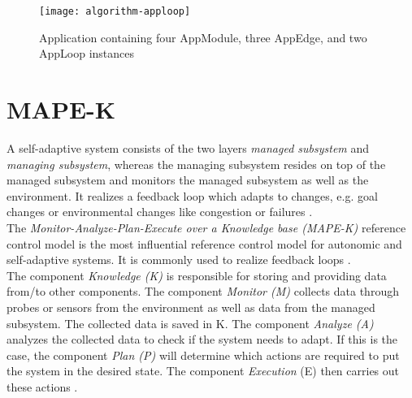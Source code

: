\begin{figure}[htb]
    \centering
    \texttt{[image: algorithm-apploop]}
    \caption{Application containing four AppModule, three AppEdge, and two \mbox{AppLoop} instances}
    \label{fig:apploop}
\end{figure}

\section{MAPE-K}
A self-adaptive system consists of the two layers \textit{managed subsystem} and \textit{managing subsystem}, whereas the managing subsystem resides on top of the managed subsystem and monitors the managed subsystem as well as the environment.
It realizes a feedback loop which adapts to changes, e.g. goal changes or environmental changes like congestion or failures \cite{mape-k}.\\

The \textit{Monitor-Analyze-Plan-Execute over a Knowledge base (MAPE-K)} \cite{autonomic-computing} reference control model is the most influential reference control model for autonomic and self-adaptive systems.
It is commonly used to realize feedback loops \cite{mape-k}.\\

The component \textit{Knowledge (K)} is responsible for storing and providing data from/to other components.
The component \textit{Monitor (M)} collects data through probes or sensors from the environment as well as data from the managed subsystem.
The collected data is saved in K.
The component \textit{Analyze (A)} analyzes the collected data to check if the system needs to adapt.
If this is the case, the component \textit{Plan (P)} will determine which actions are required to put the system in the desired state.
The component \textit{Execution} (E) then carries out these actions \cite{mape-k}.
